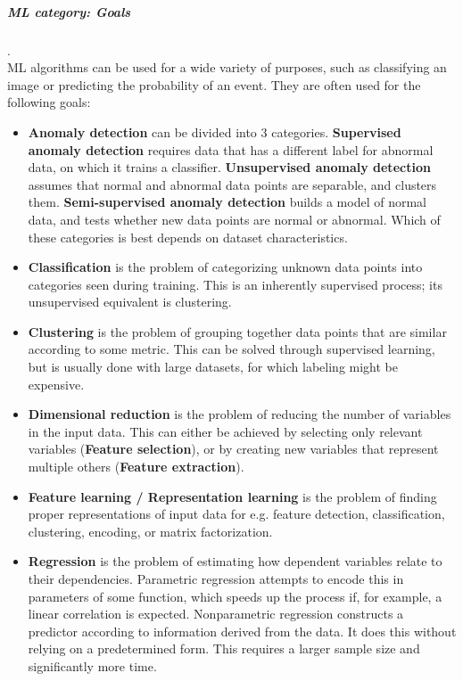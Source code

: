\subparagraph{ML category: Goals}
.\\
ML algorithms can be used for a wide variety of purposes, such as classifying an image or predicting the probability of an event. They are often used for the following goals:
\begin{itemize}
	\item \textbf{Anomaly detection}
		can be divided into 3 categories. \textbf{Supervised anomaly detection} requires data that has a different label for abnormal data, on which it trains a classifier. \textbf{Unsupervised anomaly detection} assumes that normal and abnormal data points are separable, and clusters them. \textbf{Semi-supervised anomaly detection} builds a model of normal data, and tests whether new data points are normal or abnormal. Which of these categories is best depends on dataset characteristics.
	\item \textbf{Classification}
		is the problem of categorizing unknown data points into categories seen during training. This is an inherently supervised process; its unsupervised equivalent is clustering.
	\item \textbf{Clustering}
		is the problem of grouping together data points that are similar according to some metric. This can be solved through supervised learning, but is usually done with large datasets, for which labeling might be expensive.
	\item \textbf{Dimensional reduction}
		is the problem of reducing the number of variables in the input data. This can either be achieved by selecting only relevant variables (\textbf{Feature selection}), or by creating new variables that represent multiple others (\textbf{Feature extraction}).
	\item \textbf{Feature learning / Representation learning}
		is the problem of finding proper representations of input data for e.g. feature detection, classification, clustering, encoding, or matrix factorization.
	\item \textbf{Regression}
		is the problem of estimating how dependent variables relate to their dependencies. Parametric regression attempts to encode this in parameters of some function, which speeds up the process if, for example, a linear correlation is expected. Nonparametric regression constructs a predictor according to information derived from the data. It does this without relying on a predetermined form. This requires a larger sample size and significantly more time.
\end{itemize}

